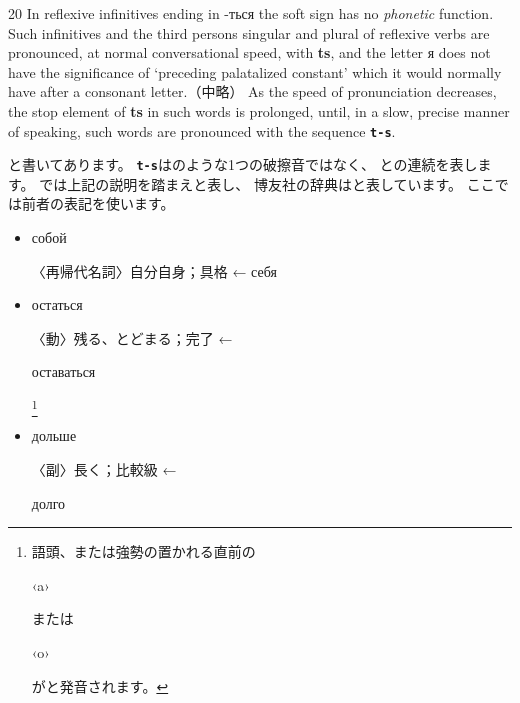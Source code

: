 \documentclass[12pt]{ltjsarticle}
\begin{document}
\bigskip

\begin{indentation}{2\zw}{0\zw}
In reflexive infinitives ending in -ться the soft sign has no \textit{phonetic} function.
Such infinitives and the third persons singular and plural of reflexive verbs are pronounced,
at normal conversational speed, with \textbf{ts},
and the letter я does not have the significance of ‘preceding palatalized constant’ which it would normally have after a consonant letter.（中略）
As the speed of pronunciation decreases,
the stop element of \textbf{ts} in such words is prolonged, until, in a slow, precise manner of speaking, such words are pronounced with the sequence \texttt{\textbf{t-s}}.
\end{indentation}

\bigskip

\noindent と書いてあります。
\texttt{\textbf{t-s}}は\textipa{/\texttslig/}のような1つの破擦音ではなく、
との連続を表します。
\citep{jones2011}では上記の説明を踏まえ\textipa{/{\texttslig}/}と表し、
博友社の辞典はと表しています。
ここでは前者の表記を使います。

\begin{itemize}
    \item \begin{russian}собой\end{russian}  〈再帰代名詞〉自分自身；具格 ← себя 
    \item \begin{russian}остаться\end{russian}  〈動〉残る、とどまる；完了 ← \begin{russian}оставаться\end{russian} \footnote{語頭、または強勢の置かれる直前の \begin{russian}‹a›\end{russian} または \begin{russian}‹o›\end{russian} がと発音されます。}
    \item \begin{russian}дольше\end{russian}  〈副〉長く；比較級 ← \begin{russian}долго\end{russian}
\end{itemize}
\end{document}
